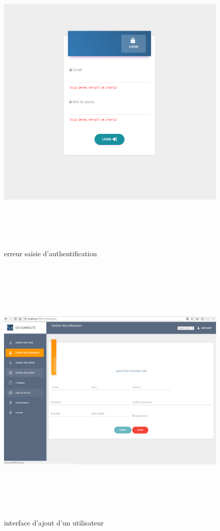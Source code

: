 \documentclass{article}
\begin{document}
\begin{figure}[H]
\centering
\vspace*{0.8in}
\includegraphics[height=6in]{authenErreur.PNG}
\caption[Figure17 : erreur saisie de donnée ]{erreur saisie d'authentification}
\label{fig:pic9}
\end{figure}

\begin{figure}[H]
\centering
\vspace*{0.8in}
\includegraphics[height=5.2in]{ajoutUtilisateur.PNG}
\caption[Figure18 : interface d'ajout d'un utilisateur ]{interface d'ajout d'un utilisateur}
\label{fig:pic10}
\end{figure}
\end{document}
